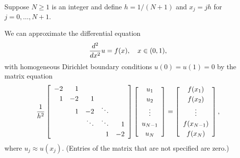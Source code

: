 Suppose $N\ge 1$ is an integer and define $h = 1/(N+1)$ and $x_j = jh$ for $j=0,\ldots, N+1$.

We can approximate the differential equation
\[ {d^2 \over dx^2} u = f(x), \quad x\in (0,1),\]
with homogeneous Dirichlet boundary conditions $u(0)=u(1) = 0$ by the matrix equation
\[ {1\over h^2} \left[\begin{array}{rrrrr}
              -2 & 1 \\[0.25em]
               1 & -2 & 1 \\
                 &  1  & -2 & \ddots \\
                 & & \ddots & \ddots & 1 \\[0.25em]
                 & & & 1 & -2 
               \end{array}\right]
          \left[\begin{array}{c} u_1 \\[0.25em] u_2 \\[0.25em] \vdots \\[0.25em] u_{N-1} \\[0.25em] u_N \end{array}\right]
 =   \left[\begin{array}{c} f(x_1) \\[0.25em] f(x_2) \\[0.25em] \vdots \\[0.25em] f(x_{N-1}) \\[0.25em] f(x_N) \end{array}\right],\]
where $u_j \approx u(x_j)$.  (Entries of the matrix that are not specified are zero.)

